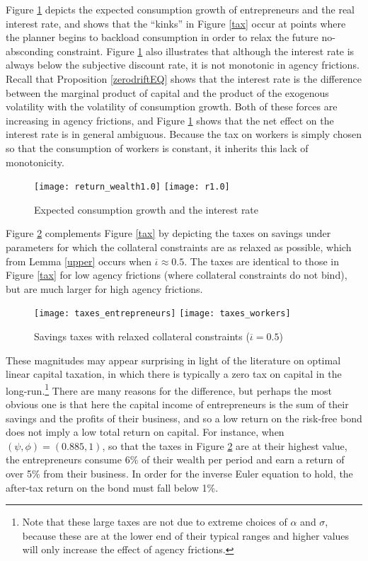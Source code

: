 \documentclass[11pt]{article}
\theoremstyle{plain}
\theoremstyle{definition} %
\begin{document}
Figure \ref{r_muc} depicts the expected consumption growth of entrepreneurs and the real interest rate, and shows that the ``kinks'' in Figure \ref{tax} occur at points where the planner begins to backload consumption in order to relax the future no-absconding constraint. Figure \ref{r_muc} also illustrates that although the interest rate is always below the subjective discount rate, it is not monotonic in agency frictions. Recall that Proposition \ref{zerodriftEQ} shows that the interest rate is the difference between the marginal product of capital and the product of the exogenous volatility with the volatility of consumption growth. Both of these forces are increasing in agency frictions, and Figure \ref{r_muc} shows that the net effect on the interest rate is in general ambiguous. Because the tax on workers is simply chosen so that the consumption of workers is constant, it inherits this lack of monotonicity. 

\begin{figure}[H]
\centering
\caption{Expected consumption growth and the interest rate}
\texttt{[image: return\_wealth1.0]}
\texttt{[image: r1.0]}
\label{r_muc} 
\end{figure} 

Figure \ref{tax2} complements Figure \ref{tax} by depicting the taxes on savings under parameters for which the collateral constraints are as relaxed as possible, which from Lemma \ref{upper} occurs when $\overline{\iota} \approx 0.5$. The taxes are identical to those in Figure \ref{tax} for low agency frictions (where collateral constraints do not bind), but are much larger for high agency frictions. 

\begin{figure}[H]
\centering
\caption{Savings taxes with relaxed collateral constraints ($\overline{\iota}=0.5$)}
\texttt{[image: taxes\_entrepreneurs]}
\texttt{[image: taxes\_workers]}
\label{tax2} 
\end{figure} 

These magnitudes may appear surprising in light of the literature on optimal linear capital taxation, in which there is typically a zero tax on capital in the long-run.\footnote{Note that these large taxes are not due to extreme choices of $\alpha$ and $\sigma$, because these are at the lower end of their typical ranges and higher values will only increase the effect of agency frictions.} There are many reasons for the difference, but perhaps the most obvious one is that here the capital income of entrepreneurs is the sum of their savings and the profits of their business, and so a low return on the risk-free bond does not imply a low total return on capital. For instance, when $(\psi, \phi) = (0.885, 1)$, so that the taxes in Figure \ref{tax2} are at their highest value, the entrepreneurs consume 6\% of their wealth per period and earn a return of over 5\% from their business. In order for the inverse Euler equation to hold, the after-tax return on the bond must fall below 1\%.
\end{document}
